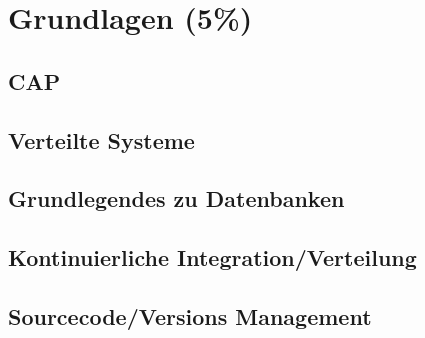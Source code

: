\chapter{Grundlagen (5\%)}
\section{CAP}
\section{Verteilte Systeme}
\section{Grundlegendes zu Datenbanken}
\section{Kontinuierliche Integration/Verteilung}

\section{Sourcecode/Versions Management}

